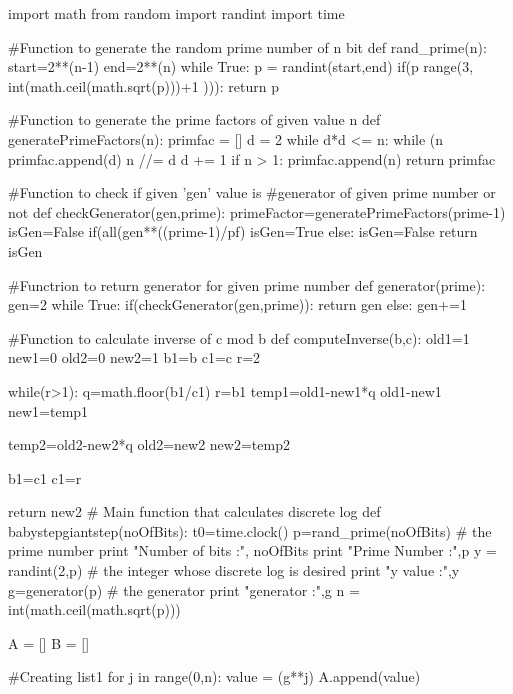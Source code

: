 \documentclass{article}
\begin{document}
\begin{python}

import math
from random import randint
import time

#Function to generate the random prime number of n bit
def rand_prime(n):
    start=2**(n-1)
    end=2**(n)
    while True:
        p = randint(start,end)
        if(p %
            range(3, int(math.ceil(math.sqrt(p)))+1 ))):
            return p

#Function to generate the prime factors of given value n
def generatePrimeFactors(n):
    primfac = []
    d = 2
    while d*d <= n:
        while (n %
            primfac.append(d)
            n //= d
        d += 1
    if n > 1:
       primfac.append(n)
    return primfac

#Function to check if given 'gen' value is 
#generator of given prime number or not
def checkGenerator(gen,prime):
    primeFactor=generatePrimeFactors(prime-1)
    isGen=False
    if(all(gen**((prime-1)/pf) %
        isGen=True
    else:
        isGen=False
    return isGen

#Functrion to return generator for given prime number
def generator(prime):
    gen=2
    while True:
        if(checkGenerator(gen,prime)):
            return gen
        else:
            gen+=1

#Function to calculate inverse of c mod b
def computeInverse(b,c):
    old1=1
    new1=0
    old2=0
    new2=1
    b1=b
    c1=c
    r=2

    while(r>1):
        q=math.floor(b1/c1)
        r=b1%
        temp1=old1-new1*q
        old1-new1
        new1=temp1

        temp2=old2-new2*q
        old2=new2
        new2=temp2

        b1=c1
        c1=r

    return new2    
# Main function that calculates discrete log
def babystepgiantstep(noOfBits):
    t0=time.clock()
    p=rand_prime(noOfBits)  # the prime number
    print "Number of bits :", noOfBits
    print "Prime Number :",p
    y = randint(2,p)  # the integer whose discrete log is desired
    print "y value :",y
    g=generator(p)  # the generator
    print "generator :",g
    n = int(math.ceil(math.sqrt(p)))  
 
    A = []
    B = []

    #Creating list1
    for j in range(0,n):
        value = (g**j) %
        A.append(value)


\end{python}
\end{document}
